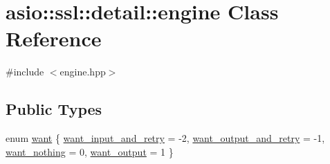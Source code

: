 \hypertarget{classasio_1_1ssl_1_1detail_1_1engine}{}\section{asio\+:\+:ssl\+:\+:detail\+:\+:engine Class Reference}
\label{classasio_1_1ssl_1_1detail_1_1engine}


{\ttfamily \#include $<$engine.\+hpp$>$}

\subsection*{Public Types}
\begin{DoxyCompactItemize}
\item 
enum \hyperlink{classasio_1_1ssl_1_1detail_1_1engine_ab9812153941a6a93c9095f4e5ca8f915}{want} \{ \hyperlink{classasio_1_1ssl_1_1detail_1_1engine_ab9812153941a6a93c9095f4e5ca8f915a4ed0c40b89cc4244f27cf4fa0462dc98}{want\+\_\+input\+\_\+and\+\_\+retry} = -\/2, 
\hyperlink{classasio_1_1ssl_1_1detail_1_1engine_ab9812153941a6a93c9095f4e5ca8f915ae945ff629b4b3fb8f8e4424eea2941b1}{want\+\_\+output\+\_\+and\+\_\+retry} = -\/1, 
\hyperlink{classasio_1_1ssl_1_1detail_1_1engine_ab9812153941a6a93c9095f4e5ca8f915a1b2c9a51b5a4f1cb75ef746e8c11faa8}{want\+\_\+nothing} = 0, 
\hyperlink{classasio_1_1ssl_1_1detail_1_1engine_ab9812153941a6a93c9095f4e5ca8f915ac4b31f22eb4446bfc12d48198ff1438d}{want\+\_\+output} = 1
 \}
\end{DoxyCompactItemize}
